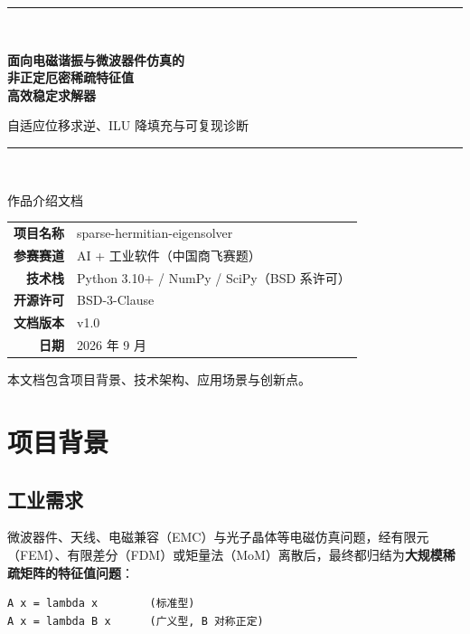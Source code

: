\documentclass[11pt,a4paper]{ctexart}
\begin{document}
\begin{titlepage}
\centering
\vspace*{2.2cm}
{\color{accent}\rule{\textwidth}{1.4pt}}\\[0.9cm]
{\Huge\bfseries 面向电磁谐振与微波器件仿真的\\[0.35cm]非正定厄密稀疏特征值\\[0.35cm]高效稳定求解器\par}
\vspace{0.9cm}
{\Large 自适应位移求逆、ILU 降填充与可复现诊断\par}
\vspace{0.6cm}
{\color{accent}\rule{\textwidth}{1.4pt}}\\[2.0cm]
{\large 作品介绍文档\par}
\vspace{2.4cm}
{\large
\begin{tabular}{rl}
\textbf{项目名称} & sparse-hermitian-eigensolver \\[0.3cm]
\textbf{参赛赛道} & AI + 工业软件（中国商飞赛题） \\[0.3cm]
\textbf{技术栈} & Python 3.10+ / NumPy / SciPy（BSD 系许可） \\[0.3cm]
\textbf{开源许可} & BSD-3-Clause \\[0.3cm]
\textbf{文档版本} & v1.0 \\[0.3cm]
\textbf{日期} & 2026 年 9 月 \\
\end{tabular}\par}
\vfill
{\small 本文档包含项目背景、技术架构、应用场景与创新点。\par}
\end{titlepage}

\tableofcontents
\newpage

\section{项目背景}

\subsection{工业需求}

微波器件、天线、电磁兼容（EMC）与光子晶体等电磁仿真问题，经有限元（FEM）、有限差分（FDM）或矩量法（MoM）离散后，最终都归结为\textbf{大规模稀疏矩阵的特征值问题}：

\begin{lstlisting}
A x = lambda x        (标准型)
A x = lambda B x      (广义型, B 对称正定)
\end{lstlisting}
\end{document}
